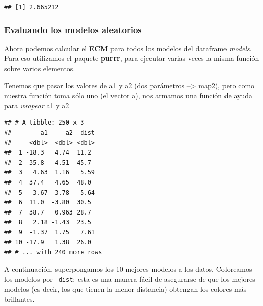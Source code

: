 \documentclass[]{book}
\newenvironment{Shaded}{\begin{snugshade}}{\end{snugshade}}
\newcommand{\ControlFlowTok}[1]{\textcolor[rgb]{0.13,0.29,0.53}{\textbf{#1}}}
\newcommand{\DataTypeTok}[1]{\textcolor[rgb]{0.13,0.29,0.53}{#1}}
\newcommand{\KeywordTok}[1]{\textcolor[rgb]{0.13,0.29,0.53}{\textbf{#1}}}
\newcommand{\NormalTok}[1]{#1}
\newcommand{\OperatorTok}[1]{\textcolor[rgb]{0.81,0.36,0.00}{\textbf{#1}}}
\newcommand{\StringTok}[1]{\textcolor[rgb]{0.31,0.60,0.02}{#1}}
\begin{document}
\begin{verbatim}
## [1] 2.665212
\end{verbatim}

\hypertarget{evaluando-los-modelos-aleatorios}{%
\subsubsection{Evaluando los modelos aleatorios}\label{evaluando-los-modelos-aleatorios}}

Ahora podemos calcular el \textbf{ECM} para todos los modelos del dataframe \emph{models}. Para eso utilizamos el paquete \textbf{purrr}, para ejecutar varias veces la misma función sobre varios elementos.

Tenemos que pasar los valores de a1 y a2 (dos parámetros --\textgreater{} map2), pero como nuestra función toma sólo uno (el vector a), nos armamos una función de ayuda para \emph{wrapear} a1 y a2

\begin{Shaded}
\end{Shaded}

\begin{verbatim}
## # A tibble: 250 x 3
##        a1     a2  dist
##     <dbl>  <dbl> <dbl>
##  1 -18.3   4.74  11.2 
##  2  35.8   4.51  45.7 
##  3   4.63  1.16   5.59
##  4  37.4   4.65  48.0 
##  5  -3.67  3.78   5.64
##  6  11.0  -3.80  30.5 
##  7  38.7   0.963 28.7 
##  8   2.18 -1.43  23.5 
##  9  -1.37  1.75   7.61
## 10 -17.9   1.38  26.0 
## # ... with 240 more rows
\end{verbatim}

A continuación, superpongamos los 10 mejores modelos a los datos. Coloreamos los modelos por \texttt{-dist}: esta es una manera fácil de asegurarse de que los mejores modelos (es decir, los que tienen la menor distancia) obtengan los colores más brillantes.
\end{document}
